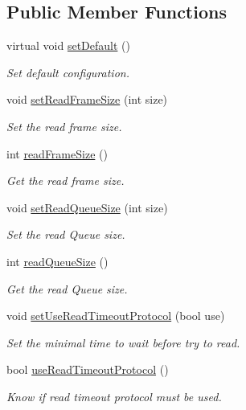 \subsection*{Public Member Functions}
\begin{DoxyCompactItemize}
\item 
virtual void \hyperlink{classmdt_port_config_a1cad2f21252411977fe328f89b68fbfb}{setDefault} ()
\begin{DoxyCompactList}\small\item\em Set default configuration. \end{DoxyCompactList}\item 
void \hyperlink{classmdt_port_config_a02f3c9744b0d7a61853ab58467278bbc}{setReadFrameSize} (int size)
\begin{DoxyCompactList}\small\item\em Set the read frame size. \end{DoxyCompactList}\item 
int \hyperlink{classmdt_port_config_af4c2705ed15338f9fa5f895b2c9cf392}{readFrameSize} ()
\begin{DoxyCompactList}\small\item\em Get the read frame size. \end{DoxyCompactList}\item 
void \hyperlink{classmdt_port_config_a04d8e81844deaff20a890ea24e2f9634}{setReadQueueSize} (int size)
\begin{DoxyCompactList}\small\item\em Set the read Queue size. \end{DoxyCompactList}\item 
int \hyperlink{classmdt_port_config_acbeb17f5ee40cd4ab10e816ebd4db3ef}{readQueueSize} ()
\begin{DoxyCompactList}\small\item\em Get the read Queue size. \end{DoxyCompactList}\item 
void \hyperlink{classmdt_port_config_a5e7857a56ab2baff4bd0a77290b3c742}{setUseReadTimeoutProtocol} (bool use)
\begin{DoxyCompactList}\small\item\em Set the minimal time to wait before try to read. \end{DoxyCompactList}\item 
bool \hyperlink{classmdt_port_config_ae2516b9a714f69e3ebb8f2b47d459b50}{useReadTimeoutProtocol} ()
\begin{DoxyCompactList}\small\item\em Know if read timeout protocol must be used. \end{DoxyCompactList}\item 

\end{DoxyCompactItemize}
